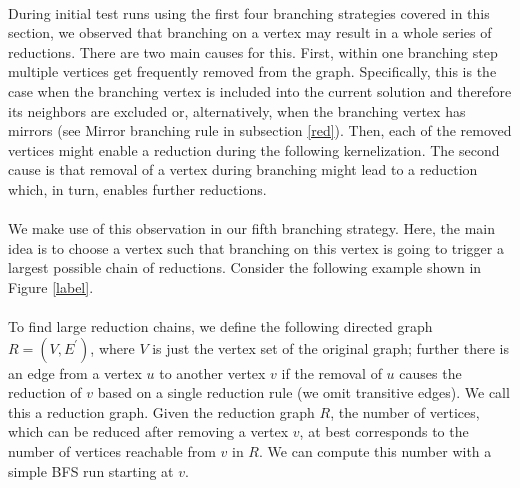 \documentclass[]{article}
\begin{document}
\paragraph{}
During initial test runs using the first four branching strategies covered in this section, we observed that branching on a vertex may result in a whole series of reductions. There are two main causes for this. First, within one branching step multiple vertices get frequently removed from the graph. Specifically, this is the case when the branching vertex is included into the current solution and therefore its neighbors are excluded or, alternatively, when the branching vertex has mirrors (see Mirror branching rule in subsection \ref{red}). Then, each of the removed vertices might enable a reduction during the following kernelization. The second cause is that removal of a vertex during branching might lead to a reduction which, in turn, enables further reductions. 
\paragraph{}
We make use of this observation in our fifth branching strategy. Here, the main idea is to choose a vertex such that branching on this vertex is going to trigger a largest possible chain of reductions. Consider the following example shown in Figure \ref{label}. 

\paragraph{}
To find large reduction chains, we define the following directed graph $R=(V, E^\prime)$, where $V$ is just the vertex set of the original graph; further there is an edge from a vertex $u$ to another vertex $v$ if the removal of $u$ causes the reduction of $v$ based on a single reduction rule (we omit transitive edges). We call this a reduction graph. Given the reduction graph $R$, the number of vertices, which can be reduced after removing a vertex $v$, at best corresponds to the number of vertices reachable from $v$ in $R$. We can compute this number with a simple BFS run starting at $v$.
\end{document}
